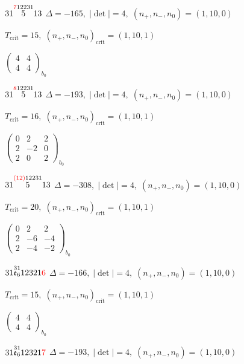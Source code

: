 \documentclass[10pt]{article}
\begin{document}
$31\overset{\textcolor{red}{7}12231}{5}13$ \quad $\Delta=-165,\; |\det|=4,\; (n_+,n_-,n_0)=(1,10,0)$

\hspace{1em}$T_{\text{crit}}=15,\; (n_+,n_-,n_0)_{\text{crit}}=(1,10,1)$

\hspace{2em}$\left(\begin{smallmatrix}4 & 4 \\ 4 & 4\end{smallmatrix}\right)_{\!b_0}$

$31\overset{\textcolor{red}{8}12231}{5}13$ \quad $\Delta=-193,\; |\det|=4,\; (n_+,n_-,n_0)=(1,10,0)$

\hspace{1em}$T_{\text{crit}}=16,\; (n_+,n_-,n_0)_{\text{crit}}=(1,10,1)$

\hspace{2em}$\left(\begin{smallmatrix}0 & 2 & 2 \\ 2 & -2 & 0 \\ 2 & 0 & 2\end{smallmatrix}\right)_{\!b_0}$

$31\overset{\textcolor{red}{(12)}12231}{5}13$ \quad $\Delta=-308,\; |\det|=4,\; (n_+,n_-,n_0)=(1,10,0)$

\hspace{1em}$T_{\text{crit}}=20,\; (n_+,n_-,n_0)_{\text{crit}}=(1,10,1)$

\hspace{2em}$\left(\begin{smallmatrix}0 & 2 & 2 \\ 2 & -6 & -4 \\ 2 & -4 & -2\end{smallmatrix}\right)_{\!b_0}$

\smallskip

$31\overset{31}{\mathfrak{e}_6}12321\textcolor{red}{6}$ \quad $\Delta=-166,\; |\det|=4,\; (n_+,n_-,n_0)=(1,10,0)$

\hspace{1em}$T_{\text{crit}}=15,\; (n_+,n_-,n_0)_{\text{crit}}=(1,10,1)$

\hspace{2em}$\left(\begin{smallmatrix}4 & 4 \\ 4 & 4\end{smallmatrix}\right)_{\!b_0}$

$31\overset{31}{\mathfrak{e}_6}12321\textcolor{red}{7}$ \quad $\Delta=-193,\; |\det|=4,\; (n_+,n_-,n_0)=(1,10,0)$
\end{document}
